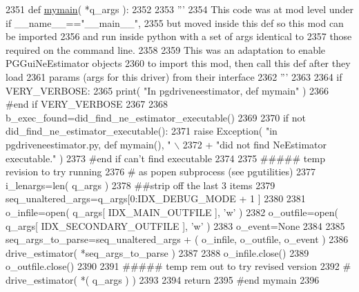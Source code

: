 \begin{DoxyCode}
2351 \textcolor{keyword}{def }\hyperlink{namespacenegui_1_1pgdriveneestimator_a9195d73a2642b87625772820ffff8023}{mymain}( *q\_args ):
2352 
2353     \textcolor{stringliteral}{'''}
2354 \textcolor{stringliteral}{    This code was at mod level under if \_\_name\_\_=="\_\_main\_\_",}
2355 \textcolor{stringliteral}{    but moved inside this def so this mod can be imported}
2356 \textcolor{stringliteral}{    and run inside python with a set of args identical to}
2357 \textcolor{stringliteral}{    those required on the command line.}
2358 \textcolor{stringliteral}{}
2359 \textcolor{stringliteral}{    This was an adaptation to enable PGGuiNeEstimator objects}
2360 \textcolor{stringliteral}{    to import this mod, then call this def after they load }
2361 \textcolor{stringliteral}{    params (args for this driver) from their interface}
2362 \textcolor{stringliteral}{    '''}
2363     
2364     \textcolor{keywordflow}{if} VERY\_VERBOSE:
2365         print( \textcolor{stringliteral}{"In pgdriveneestimator, def mymain"} )
2366     \textcolor{comment}{#end if VERY\_VERBOSE}
2367 
2368     b\_exec\_found=did\_find\_ne\_estimator\_executable()
2369 
2370     \textcolor{keywordflow}{if} \textcolor{keywordflow}{not} did\_find\_ne\_estimator\_executable():
2371         \textcolor{keywordflow}{raise} Exception( \textcolor{stringliteral}{"in pgdriveneestimator.py, def mymain(), "} \(\backslash\)
2372                             + \textcolor{stringliteral}{"did not find NeEstimator executable."} )
2373     \textcolor{comment}{#end if can't find executable}
2374     
2375     \textcolor{comment}{##### temp revision to try running}
2376     \textcolor{comment}{# as popen subprocess (see pgutilities)}
2377     i\_lenargs=len( q\_args )
2378     \textcolor{comment}{##strip off the last 3 items}
2379     seq\_unaltered\_args=q\_args[0:IDX\_DEBUG\_MODE + 1 ]
2380     
2381     o\_infile=open(  q\_args[ IDX\_MAIN\_OUTFILE ], \textcolor{stringliteral}{'w'} )
2382     o\_outfile=open( q\_args[ IDX\_SECONDARY\_OUTFILE ], \textcolor{stringliteral}{'w'} )
2383     o\_event=\textcolor{keywordtype}{None}
2384 
2385     seq\_args\_to\_parse=seq\_unaltered\_args + ( o\_infile, o\_outfile, o\_event )
2386     drive\_estimator( *seq\_args\_to\_parse )
2387 
2388     o\_infile.close()
2389     o\_outfile.close()
2390 
2391     \textcolor{comment}{##### temp rem out to try revised version}
2392 \textcolor{comment}{#   drive\_estimator(  *( q\_args ) )}
2393 
2394     \textcolor{keywordflow}{return}
2395 \textcolor{comment}{#end mymain}
2396 
\end{DoxyCode}
